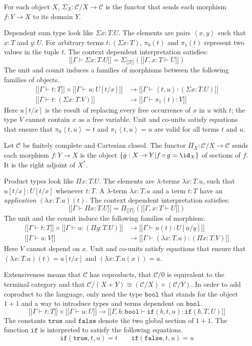 \documentclass{tac}
\newcommand\cat\mathcal
\newcommand\set[1]{\left\{#1\right\}}
\newcommand\ri{^*}
\newcommand\of{:}
\newcommand\db[1]{{[\![}#1{]\!]}}
\newcommand\dsum{\Sigma_}
\newcommand\dprod{\Pi_}
\newcommand\tuple[1]{\left\langle #1 \right\rangle}
\newcommand\true{\mathtt{true}}
\newcommand\false{\mathtt{false}}
\newcommand\bool{\mathtt{bool}}
\newcommand\ttif{\mathtt{if}}
\begin{document}
For each object $X$, $\dsum X\of\cat C/X\to \cat C$ is the functor that sends each morphism $f\of Y\to X$ to its domain $Y$.

Dependent sum type look like $\Sigma x\of T.U$. The elements are pairs $\tuple{x,y}$ such that $x\of T$ and $y\of U$. For arbitrary terms $t\of(\Sigma x\of T)$, $\pi_0(t)$ and $\pi_1(t)$ represent two values in the tuple $t$. The context dependent interpretation satisfies:
\[ \db{\Gamma\vdash\Sigma x\of T.U} = \dsum {\db T}(\db{\Gamma,x\of T\vdash U}) \]
The unit and counit induces a families of morphisms between the following families of objects.
\begin{align*}
\db{\Gamma\vdash t\of T}\times\db{\Gamma\vdash u\of U[t/x]} &\to \db{\Gamma\vdash \tuple{t, u}\of(\Sigma x\of T.U)}\\
\db{\Gamma\vdash t\of (\Sigma x\of T.V)}&\to \db{\Gamma\vdash \pi_1(t) \of V}
\end{align*}
Here $u[t/x]$ is the result of replacing every free occurrence of $x$ in $u$ with $t$; the type $V$ cannot contain $x$ as a free variable. Unit and co-units satisfy equations that ensure that $\pi_0\tuple{t,u}=t$ and $\pi_1\tuple{t,u}=u$ are valid for all terms $t$ and $u$.


Let $\cat C$ be finitely complete and Cartesian closed. The functor $\dprod X\of\cat C/X\to \cat C$ sends each morphism $f\of Y\to X$ is the object $\set{g\of X\to Y| f\circ g = \id_X }$ of sections of $f$. It is the right adjoint of $X\ri$.

Product types look like $\Pi x\of T.U$. The elements are $\lambda$-terms $\lambda x\of T.u$, such that $u[t/x]\of U[t/x]$ whenever $t\of T$. A $\lambda$-term $\lambda x\of T.u$ and a term $t\of T$ have an \emph{application} $(\lambda x\of T.u)(t)$. The context dependent interpretation satisfies:
\[ \db{\Gamma\vdash\Pi x\of T.U} = \dprod {\db T}(\db{\Gamma,x\of T\vdash U}) \]
The unit and the counit induce the following families of morphism:
\begin{align*}
\db{\Gamma\vdash t\of T}\times\db{\Gamma\vdash u\of(\Pi y\of T.U)}&\to\db{\Gamma\vdash u(t)\of U[u/y]}\\
\db{\Gamma\vdash u\of V}&\to\db{\Gamma\vdash (\lambda x\of T.u)\of(\Pi x\of T.V)}
\end{align*}
Here $V$ cannot depend on $x$. Unit and co-units satisfy equations that ensure that $(\lambda x\of T.u)(t) = u[t/x]$ and $(\lambda x\of T.u(x))=u$.

Extensiveness means that $\cat C$ has coproducts, that $\cat C/0$ is equivalent to the terminal category and that $\cat C/(X+Y)\cong (\cat C/X)\times(\cat C/Y)$. In order to add coproduct to the language, only need the type $\bool$ that stands for the object $1+1$ and a way to introduce types and terms dependent on $\bool$.
\[ \db{\Gamma\vdash t\of T}\times\db{\Gamma\vdash u\of U}\to\db{\Gamma,b\of\bool\vdash \ttif(b,t,u)\of\ttif(b,T,U)} \]
The constants $\true$ and $\false$ denote the two global section of $1+1$. The function $\ttif$ is interpreted to satisfy the following equations.
\[ \ttif(\true,t,u)=t\qquad\ttif(\false,t,u) = u\]
\end{document}
